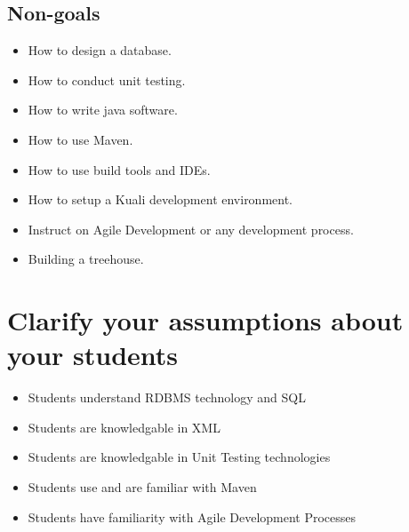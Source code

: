 \documentclass[12pt,notitlepage]{article}
\begin{document}
\subsection{Non-goals}
\begin{itemize}
\item How to design a database.
\item How to conduct unit testing.
\item How to write java software. 
\item How to use Maven.
\item How to use build tools and IDEs.
\item How to setup a Kuali development environment.
\item Instruct on Agile Development or any development process.
\item Building a treehouse.
\end{itemize}

\section{Clarify your assumptions about your students}
\begin{itemize}
\item Students understand RDBMS technology and SQL
\item Students are knowledgable in XML
\item Students are knowledgable in Unit Testing technologies
\item Students use and are familiar with Maven
\item Students have familiarity with Agile Development Processes
\end{itemize}
\end{document}
